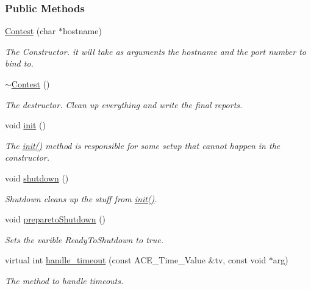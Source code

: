 \subsubsection*{Public Methods}
\begin{CompactItemize}
\item 
\hyperlink{classContest_Contesta0}{Contest} (char $\ast$hostname)
\begin{CompactList}\small\item\em The Constructor. it will take as arguments the hostname and the port number to bind to.\item\end{CompactList}\item 
\hyperlink{classContest_Contesta1}{$\sim$Contest} ()
\begin{CompactList}\small\item\em The destructor. Clean up everything and write the final reports.\item\end{CompactList}\item 
void \hyperlink{classContest_Contesta2}{init} ()
\begin{CompactList}\small\item\em The \hyperlink{classContest_Contesta2}{init()} method is responsible for some setup that cannot happen in the constructor.\item\end{CompactList}\item 
void \hyperlink{classContest_Contesta3}{shutdown} ()
\begin{CompactList}\small\item\em Shutdown cleans up the stuff from \hyperlink{classContest_Contesta2}{init()}.\item\end{CompactList}\item 
void \hyperlink{classContest_Contesta4}{prepareto\-Shutdown} ()
\begin{CompactList}\small\item\em Sets the varible Ready\-To\-Shutdown to true.\item\end{CompactList}\item 
virtual int \hyperlink{classContest_Contesta5}{handle\_\-timeout} (const ACE\_\-Time\_\-Value \&tv, const void $\ast$arg)
\begin{CompactList}\small\item\em The method to handle timeouts.\item\end{CompactList}\item 

\end{CompactItemize}
